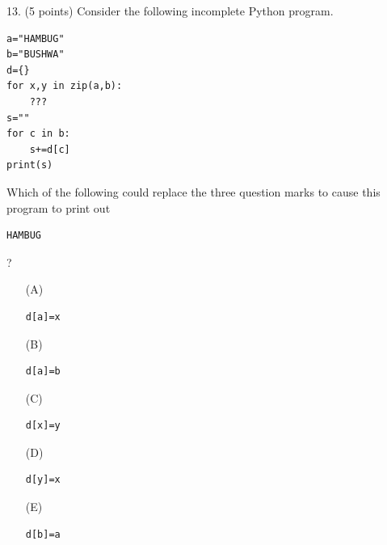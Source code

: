 \documentclass{article}
\newcounter{question}
\begin{document}
\noindent
\begin{minipage}{\textwidth}
13. (5 points)
Consider the following incomplete Python program.
\begin{verbatim}
a="HAMBUG"
b="BUSHWA"
d={}
for x,y in zip(a,b):
    ???
s=""
for c in b:
    s+=d[c]
print(s)
\end{verbatim}
Which of the following could replace the three question marks to cause this program to print out  \begin{verbatim}HAMBUG\end{verbatim}?

\begin{enumerate}
\item[(A)]
\begin{verbatim}d[a]=x\end{verbatim}

\item[(B)]
\begin{verbatim}d[a]=b\end{verbatim}

\item[(C)]
\begin{verbatim}d[x]=y\end{verbatim}

\item[(D)]
\begin{verbatim}d[y]=x\end{verbatim}

\item[(E)]
\begin{verbatim}d[b]=a\end{verbatim}

\end{enumerate}
\end{minipage}
\vspace{10em}
\filbreak\vfil{}\vfilneg
\end{document}
